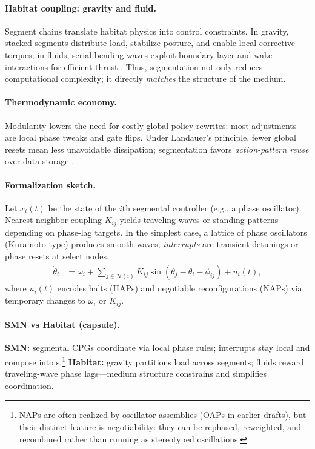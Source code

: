 \paragraph{Habitat coupling: gravity and fluid.}
Segment chains translate habitat physics into control constraints.
In gravity, stacked segments distribute load, stabilize posture, and enable local corrective torques; in fluids, serial bending waves exploit boundary-layer and wake interactions for efficient thrust \cite{Alexander2003PrinciplesLocomotion}.
Thus, segmentation not only reduces computational complexity; it directly \emph{matches} the structure of the medium.

\paragraph{Thermodynamic economy.}
Modularity lowers the need for costly global policy rewrites: most adjustments are local phase tweaks and gate flips.
Under Landauer's principle, fewer global resets mean less unavoidable dissipation; segmentation favors \emph{action-pattern reuse} over data storage \cite{Landauer1961Irreversibility,Bennett2003LandauerNotes,StillEtAl2012ThermoPrediction}.

\paragraph{Formalization sketch.}
Let $x_i(t)$ be the state of the $i$th segmental controller (e.g., a phase oscillator).
Nearest-neighbor coupling $K_{ij}$ yields traveling waves or standing patterns depending on phase-lag targets.
In the simplest case, a lattice of phase oscillators (Kuramoto-type) produces smooth waves; \emph{interrupts} are transient detunings or phase resets at select nodes.
\begin{align}
\dot{\theta}_i &= \omega_i + \sum_{j \in \mathcal{N}(i)} K_{ij} \sin(\theta_j - \theta_i - \phi_{ij}) + u_i(t),
\end{align}
where $u_i(t)$ encodes halts (HAPs) and negotiable reconfigurations (NAPs) via temporary changes to $\omega_i$ or $K_{ij}$.

\paragraph{SMN vs Habitat (capsule).}
\textbf{SMN:} segmental CPGs coordinate via local phase rules; interrupts stay local and compose into \NAP{}s.\footnote{NAPs are often realized by oscillator assemblies (OAPs in earlier drafts), but their distinct feature is negotiability: they can be rephased, reweighted, and recombined rather than running as stereotyped oscillations.}
\textbf{Habitat:} gravity partitions load across segments; fluids reward traveling-wave phase lags—medium structure constrains and simplifies coordination.


